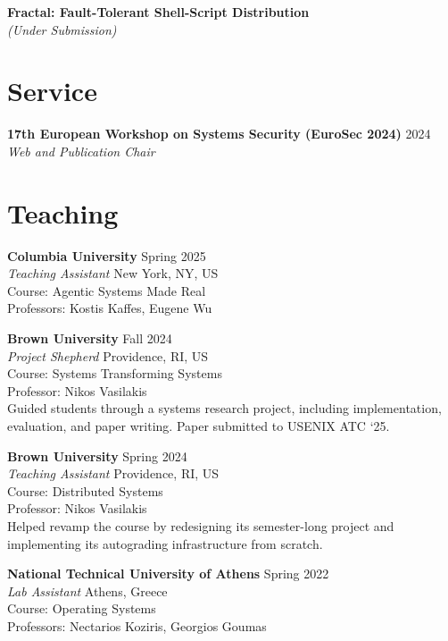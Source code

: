 \documentclass[margin, 12pt]{resume}
\newcommand{\authors}[1]{#1\xspace}
\newcommand{\equalContributionNote}{(*equal contribution)\xspace}
\newcommand{\stitle}[1]{#1:\xspace}
\newcommand{\institution}[1]{\textbf{#1}\xspace}
\newcommand{\paperTitle}[1]{\textbf{#1}\xspace}
\newcommand{\role}[1]{\textit{#1}\xspace}
\newcommand{\service}[1]{\textbf{#1}\xspace}
\newcommand{\underSubmission}{\textit{(Under Submission)}\xspace}
\newcommand{\venue}[1]{\textit{#1}\xspace}
\begin{document}
\begin{resume}
    \paperTitle{Fractal: Fault-Tolerant Shell-Script Distribution} \\
    \underSubmission

    \section{Service}

    \service{17th European Workshop on Systems Security (EuroSec 2024)} \hfill 2024 \\
    \role{Web and Publication Chair}

    \section{Teaching}

    \institution{Columbia University} \hfill Spring 2025 \\
    \role{Teaching Assistant} \hfill New York, NY, US \\
    \stitle{Course} Agentic Systems Made Real \\
    \stitle{Professors} Kostis Kaffes, Eugene Wu

    \institution{Brown University} \hfill Fall 2024 \\
    \role{Project Shepherd} \hfill Providence, RI, US \\
    \stitle{Course} Systems Transforming Systems \\
    \stitle{Professor} Nikos Vasilakis \\
    Guided students through a systems research project, including implementation, evaluation, and paper writing. Paper submitted to USENIX ATC `25.

    \institution{Brown University} \hfill Spring 2024 \\
    \role{Teaching Assistant} \hfill Providence, RI, US \\
    \stitle{Course} Distributed Systems \\
    \stitle{Professor} Nikos Vasilakis \\
    Helped revamp the course by redesigning its semester-long project and implementing its autograding infrastructure from scratch.

    \institution{National Technical University of Athens} \hfill Spring 2022 \\
    \role{Lab Assistant} \hfill Athens, Greece \\
    \stitle{Course} Operating Systems \\
    \stitle{Professors} Nectarios Koziris, Georgios Goumas


\end{resume}
\end{document}
